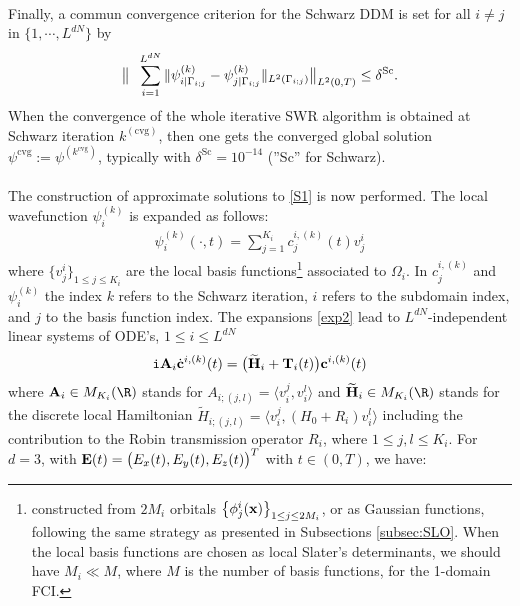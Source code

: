 \\
Finally, a commun convergence criterion for the Schwarz DDM is set for all $i\neq j$ in $\{1,\cdots,L^{dN}\}$ by
\begin{eqnarray}\label{CVTOT}
\big\| \hspace{0.2cm} \sum_{i=1}^{L^{dN}}\|\psi^{(k)}_{i|\Gamma_{i;j}}-\psi^{(k)}_{j|\Gamma_{i;j}}\|_{L^2(\Gamma_{i;j})}\big\|_{L^{2}(0,T)} \leq  \delta^{\textrm{Sc}}.
\end{eqnarray}
 When the convergence of the whole iterative SWR algorithm is obtained at Schwarz iteration $k^{(\textrm{cvg})}$, then one gets the converged global solution 
$\psi^{\textrm{cvg}}:=\psi^{(k^{\textrm{cvg}})}$, typically with $\delta^{\textrm{Sc}}=10^{-14}$ (''Sc'' for Schwarz). 
\\
\\
 The construction of approximate solutions to \eqref{S1} is now performed. The local wavefunction $\psi_i^{(k)}$ is expanded as follows:
\begin{eqnarray}\label{exp2}
\psi^{(k)}_i(\cdot,t) = \sum_{j=1}^{K_i}c_j^{i,(k)}(t)v_j^{i}
\end{eqnarray}
where $\big\{v_j^{i}\big\}_{1\leq j \leq K_i}$ are the local basis functions\footnote{constructed from $2M_i$ orbitals $\big\{\phi^i_j({\bf x})\big\}_{1\leq j\leq 2M_i}$, or as Gaussian functions, following the same strategy as presented in Subsections \ref{subsec:SLO}. When the local basis functions are chosen as local Slater's determinants, we should have $M_i \ll M$, where $M$ is the number of basis functions, for the 1-domain FCI.} associated to $\Omega_i$. In $c_j^{i,(k)}$ and $\psi^{(k)}_i$ the index $k$ refers to the Schwarz iteration, $i$ refers to the subdomain index, and $j$ to the basis function index. The expansions \eqref{exp2} lead to $L^{dN}$-independent linear systems of ODE's, $1\leq i\leq L^{dN}$
\begin{eqnarray*}
{\tt i}{\bf A}_i\dot{\bf c}^{i,(k)}(t) = \big(\widetilde{{\bf H}}_{i} + {\bf T}_i(t)\big){\bf c}^{i,(k)}(t)
\end{eqnarray*}
where ${\bf A}_{i} \in M_{K_i}(\R)$ stands for $A_{i;(j,l)} = \langle v^j_i , v^l_i\rangle$ and $\widetilde{{\bf H}}_{i} \in M_{K_i}(\R)$ stands for the discrete local Hamiltonian $\widetilde{H}_{i;(j,l)} = \langle v^j_i , (H_{0}+R_i) v^l_i\rangle$ including the contribution to the Robin transmission operator $R_i$, where $1\leq j,l \leq K_i$. For $d=3$, with ${\bf E}(t)=\big(E_x(t),E_y(t),E_z(t)\big)^T$ with $t\in (0,T)$, we have:
